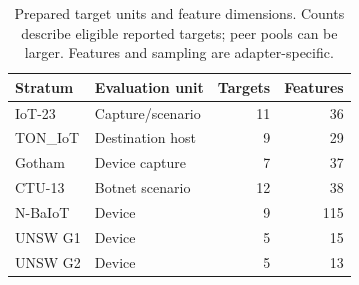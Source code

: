 \begin{table}[!htbp]
\centering
\small
\caption{Prepared target units and feature dimensions. Counts describe eligible reported targets; peer pools can be larger. Features and sampling are adapter-specific.}
\label{tab:corpora}
\begin{tabular}{llrr}
\toprule
Stratum & Evaluation unit & Targets & Features \\
\midrule
IoT-23 & Capture/scenario & 11 & 36 \\
TON\_IoT & Destination host & 9 & 29 \\
Gotham & Device capture & 7 & 37 \\
CTU-13 & Botnet scenario & 12 & 38 \\
N-BaIoT & Device & 9 & 115 \\
UNSW G1 & Device & 5 & 15 \\
UNSW G2 & Device & 5 & 13 \\
\bottomrule
\end{tabular}
\end{table}
